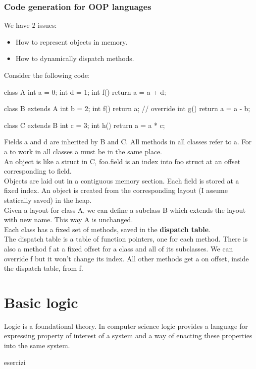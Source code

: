 \documentclass[12pt]{article}
\begin{document}
\subsubsection{Code generation for OOP languages}
We have 2 issues: 
\begin{itemize}
    \item How to represent objects in memory.
    \item How to dynamically dispatch methods.
\end{itemize}
Consider the following code: 
\begin{mycode}
    class A { 
        int a = 0;
        int d = 1;
        int f() { return a = a + d; }
    }

    class B extends A {
        int b = 2;
        int f() { return a; } // override
        int g() { return a = a - b; }
    }

    class C extends B {
        int c = 3;
        int h() { return a = a * c; }
    }
\end{mycode}
Fields a and d are inherited by B and C. All methods in all classes refer to a. For a to work in all classes a must be in the same place. 
\\ An object is like a struct in C, foo.field is an index into foo struct at an offset corresponding to field. 
\\ Objects are laid out in a contiguous memory section. Each field is stored at a fixed index. An object is created from the corresponding layout (I assume statically saved) in the heap.
\\ Given a layout for class A, we can define a subclass B which extends the layout with new name.
This way A is unchanged.
\\ Each class has a fixed set of methods, saved in the \textbf{dispatch table}. 
\\ The dispatch table is a table of function pointers, one for each method. There is also a method f at a fixed offset for a class and all of its subclasses. 
We can override f but it won't change its index.
All other methods get a on offset, inside the dispatch table, from f.

\section{Basic logic}
Logic is a foundational theory.
In computer science logic provides a language for expressing property of interest of a system and a way of enacting these properties into the same system.


\newpage
{esercizi}
\end{document}
